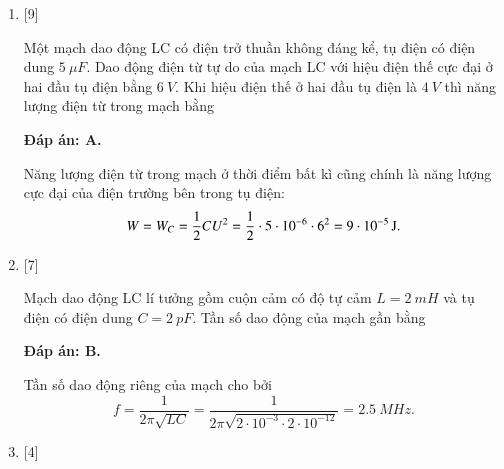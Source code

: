\begin{enumerate}[label=\bfseries Câu \arabic*:]
{	}
	
	\item {} [9]
	
	{Một mạch dao động LC có điện trở thuần không đáng kể, tụ điện có điện dung $\SI{5}{\mu F}$. Dao động điện từ tự do của mạch LC với hiệu điện thế cực đại ở hai đầu tụ điện bằng $\SI{6}{V}$. Khi hiệu điện thế ở hai đầu tụ điện là $\SI{4}{V}$ thì năng lượng điện từ trong mạch bằng
	}
	
	\hideall
	{		\textbf{Đáp án: A.}
		
		Năng lượng điện từ trong mạch ở thời điểm bất kì cũng chính là năng lượng cực đại của điện trường bên trong tụ điện:
		$$
		W = W_C = \dfrac{1}{2}CU^{2} = \dfrac{1}{2} \cdot 5\cdot10^{-6} \cdot 6^{2} = \xsi{9\cdot10^{-5}}{J}.
		$$
	}
	
	\item {} [7]
	
	{Mạch dao động LC lí tưởng gồm cuộn cảm có độ tự cảm $L = \SI{2}{mH}$ và tụ điện có điện dung $C = \SI{2}{pF}$. Tần số dao động của mạch gần bằng
	}
	
	\hideall
	{		\textbf{Đáp án: B.}
		
		Tần số dao động riêng của mạch cho bởi
		$$
		f = \dfrac{1}{2\pi \sqrt{LC}} = \dfrac{1}{2\pi \sqrt{2\cdot 10^{-3} \cdot 2\cdot 10^{-12}}} = \SI{2,5}{MHz}.
		$$
		
	}
	
	
	\item {} [4]
	

\end{enumerate}
